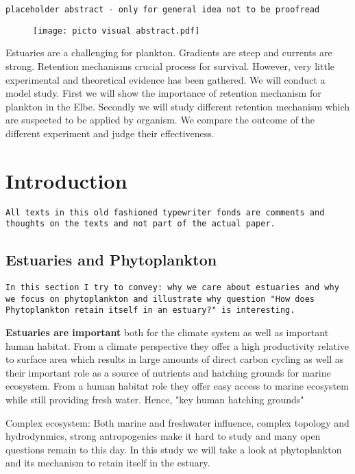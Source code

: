 \texttt{placeholder abstract - only for general idea not to be proofread}
\smallskip

\begin{figure}
    \texttt{[image: picto visual abstract.pdf]}
\end{figure}
Estuaries are a challenging for plankton.
Gradients are steep and currents are strong.
Retention mechanisms crucial process for survival.
However, very little experimental and theoretical evidence has been gathered.
We will conduct a model study.
First we will show the importance of retention mechanism for plankton in the Elbe.
Secondly we will study different retention mechanism which are suspected to be applied by organism.
We compare the outcome of the different experiment and judge their effectiveness.

\section*{Introduction}

\texttt{All texts in this old fashioned typewriter fonds are comments and thoughts on the texts and not part of the actual paper.}
\smallskip

\subsection*{Estuaries and Phytoplankton}

\texttt{In this section I try to convey: why we care about estuaries and why we focus on phytoplankton and illustrate why question "How does Phytoplankton retain itself in an estuary?" is interesting.}


\textbf{Estuaries are important} both for the climate system as well as important human habitat.
From a climate perspective they offer a high productivity relative to surface area which results in large amounts of direct carbon cycling as well as their important role as a source of nutrients and hatching grounds for marine ecosystem.
From a human habitat role they offer easy access to marine ecosystem while still providing fresh water.
Hence, "key human hatching grounds"

Complex ecosystem: Both marine and freshwater influence, complex topology and hydrodynmics, strong antropogenics make it hard to study and many open questions remain to this day.
In this study we will take a look at phytoplankton and its mechanism to retain itself in the estuary.

